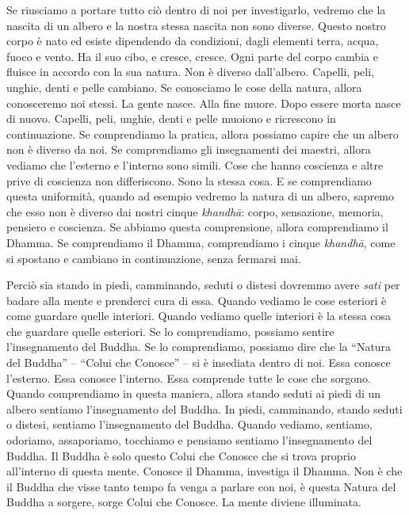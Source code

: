 Se riusciamo a portare tutto ciò dentro di noi per investigarlo, vedremo
che la nascita di un albero e la nostra stessa nascita non sono diverse.
Questo nostro corpo è nato ed esiste dipendendo da condizioni, dagli
elementi terra, acqua, fuoco e vento. Ha il suo cibo, e cresce, cresce.
Ogni parte del corpo cambia e fluisce in accordo con la sua natura. Non
è diverso dall'albero. Capelli, peli, unghie, denti e pelle cambiano. Se
conosciamo le cose della natura, allora conosceremo noi stessi. La gente
nasce. Alla fine muore. Dopo essere morta nasce di nuovo. Capelli, peli,
unghie, denti e pelle muoiono e ricrescono in continuazione. Se
comprendiamo la pratica, allora possiamo capire che un albero non è
diverso da noi. Se comprendiamo gli insegnamenti dei maestri, allora
vediamo che l'esterno e l'interno sono simili. Cose che hanno coscienza
e altre prive di coscienza non differiscono. Sono la stessa cosa. E se
comprendiamo questa uniformità, quando ad esempio vedremo la natura di
un albero, sapremo che esso non è diverso dai nostri cinque
\emph{khandhā}: corpo, sensazione, memoria, pensiero e coscienza. Se
abbiamo questa comprensione, allora comprendiamo il Dhamma. Se
comprendiamo il Dhamma, comprendiamo i cinque \emph{khandhā}, come si
spostano e cambiano in continuazione, senza fermarsi mai.

Perciò sia stando in piedi, camminando, seduti o distesi dovremmo avere
\emph{sati} per badare alla mente e prenderci cura di essa. Quando
vediamo le cose esteriori è come guardare quelle interiori. Quando
vediamo quelle interiori è la stessa cosa che guardare quelle esteriori.
Se lo comprendiamo, possiamo sentire l'insegnamento del Buddha. Se lo
comprendiamo, possiamo dire che la ``Natura del Buddha'' -- ``Colui che
Conosce'' -- si è insediata dentro di noi. Essa conosce l'esterno. Essa
conosce l'interno. Essa comprende tutte le cose che sorgono. Quando
comprendiamo in questa maniera, allora stando seduti ai piedi di un
albero sentiamo l'insegnamento del Buddha. In piedi, camminando, stando
seduti o distesi, sentiamo l'insegnamento del Buddha. Quando vediamo,
sentiamo, odoriamo, assaporiamo, tocchiamo e pensiamo sentiamo
l'insegnamento del Buddha. Il Buddha è solo questo Colui che Conosce che
si trova proprio all'interno di questa mente. Conosce il Dhamma,
investiga il Dhamma. Non è che il Buddha che visse tanto tempo fa venga
a parlare con noi, è questa Natura del Buddha a sorgere, sorge Colui che
Conosce. La mente diviene illuminata.

